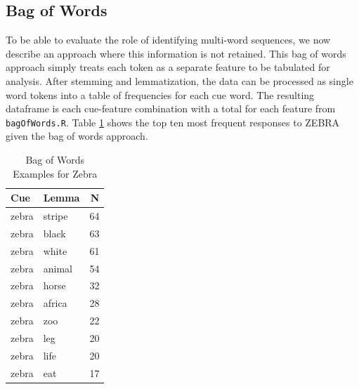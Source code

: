 \documentclass[man]{apa6}
\newenvironment{Shaded}{\begin{snugshade}}{\end{snugshade}}
\newcommand{\CommentTok}[1]{\textcolor[rgb]{0.56,0.35,0.01}{\textit{#1}}}
\newcommand{\DataTypeTok}[1]{\textcolor[rgb]{0.13,0.29,0.53}{#1}}
\newcommand{\KeywordTok}[1]{\textcolor[rgb]{0.13,0.29,0.53}{\textbf{#1}}}
\newcommand{\NormalTok}[1]{#1}
\newcommand{\OperatorTok}[1]{\textcolor[rgb]{0.81,0.36,0.00}{\textbf{#1}}}
\newcommand{\StringTok}[1]{\textcolor[rgb]{0.31,0.60,0.02}{#1}}
\begin{document}
\hypertarget{bag-of-words}{%
\subsection{Bag of Words}\label{bag-of-words}}

To be able to evaluate the role of identifying multi-word sequences, we now describe an approach where this information is not retained. This bag of words approach simply treats each token as a separate feature to be tabulated for analysis. After stemming and lemmatization, the data can be processed as single word tokens into a table of frequencies for each cue word. The resulting dataframe is each cue-feature combination with a total for each feature from \texttt{bagOfWords.R}. Table \ref{tab:tab5} shows the top ten most frequent responses to ZEBRA given the bag of words approach.

\scriptsize

\begin{Shaded}
\end{Shaded}

\normalsize

\begin{table}[t]

\caption{\label{tab:tab5}Bag of Words Examples for Zebra}
\centering
\begin{tabular}{llr}
\toprule
Cue & Lemma & N\\
\midrule
zebra & stripe & 64\\
zebra & black & 63\\
zebra & white & 61\\
zebra & animal & 54\\
zebra & horse & 32\\
\addlinespace
zebra & africa & 28\\
zebra & zoo & 22\\
zebra & leg & 20\\
zebra & life & 20\\
zebra & eat & 17\\
\bottomrule
\end{tabular}
\end{table}
\end{document}
